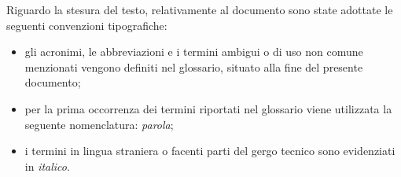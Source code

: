 Riguardo la stesura del testo, relativamente al documento sono state adottate le seguenti convenzioni tipografiche:
\begin{itemize}
	\item gli acronimi, le abbreviazioni e i termini ambigui o di uso non comune menzionati vengono definiti nel glossario, situato alla fine del presente documento;
	\item per la prima occorrenza dei termini riportati nel glossario viene utilizzata la seguente nomenclatura: \emph{parola}\glsfirstoccur;
	\item i termini in lingua straniera o facenti parti del gergo tecnico sono evidenziati in \emph{italico}.
\end{itemize}